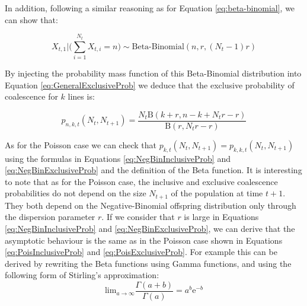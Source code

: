 \documentclass{article}
\renewcommand{\eqref}[1]{\ref{#1}}
\begin{document}
In addition, following a similar reasoning as for
Equation \eqref{eq:beta-binomial}, we can show that:

\begin{equation}
X_{t,1} \bigg| \bigg(\sum_{i=1}^{N_t} X_{t,i} = n \bigg) \sim \text{Beta-Binomial}(n,r, (N_t - 1)r)
\end{equation}

By injecting the probability mass function of this Beta-Binomial distribution into Equation 
\eqref{eq:GeneralExclusiveProb} we deduce that 
the exclusive probability of coalescence for $k$ lines is:

\begin{equation}
p_{n,k,t}(N_t, N_{t+1})=\frac{N_t \mathrm{B}(k+r, n-k+N_t r-r)}{\mathrm{B}(r, N_t r-r)}
\label{eq:NegBinExclusiveProb}
\end{equation}

As for the Poisson case we can check that $p_{k,t}(N_t, N_{t+1})=p_{k,k,t}(N_t, N_{t+1})$
using the formulas in Equations \eqref{eq:NegBinInclusiveProb} and  \eqref{eq:NegBinExclusiveProb}
and the definition of the Beta function.	
It is interesting to note that as for the Poisson case, the inclusive and exclusive coalescence probabilities do not depend on the size $N_{t+1}$ of the population at time $t+1$.
They both depend on the 
Negative-Binomial offspring distribution only through the dispersion parameter $r$.
If we consider that $r$ is large in Equations \eqref{eq:NegBinInclusiveProb} and
\eqref{eq:NegBinExclusiveProb}, we can 
derive that the asymptotic behaviour is the same as in the Poisson case  
shown in Equations  \eqref{eq:PoisInclusiveProb} and
\eqref{eq:PoisExclusiveProb}. For example this can be derived by rewriting the
Beta functions using Gamma functions, and using the following form of Stirling's approximation:
\begin{equation}
\mathrm{lim}_{a \rightarrow \infty} \frac{\Gamma(a+b)}{\Gamma(a)}=a^b \mathrm{e}^{-b}
\label{eq:stirling}
\end{equation}
\end{document}
